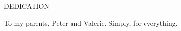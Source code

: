 \newpage
{}

\begin{center}
DEDICATION
\end{center}

\begin{center}
To my parents, Peter and Valerie. Simply, for everything.
\end{center}
